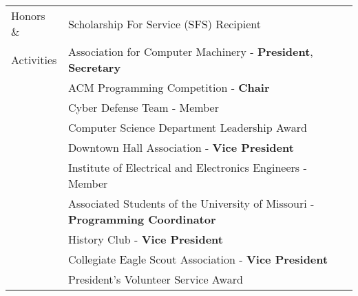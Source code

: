 \documentclass[10.5pt, arial]{article}
\begin{document}
\begin{tabular}{p{1.5cm} l}
Honors \&	& Scholarship For Service (SFS) Recipient 							\\
Activities	& Association for Computer Machinery - \textbf{President}, \textbf{Secretary}			\\
			& ACM Programming Competition - \textbf{Chair}						\\
			& Cyber Defense Team - Member										\\
			& Computer Science Department Leadership Award 						\\
			& Downtown Hall Association - \textbf{Vice President}				\\
			& Institute of Electrical and Electronics Engineers - Member		\\
			& Associated Students of the University of Missouri - \textbf{Programming Coordinator} 		\\
			& History Club - \textbf{Vice President} 							\\
			& Collegiate Eagle Scout Association - \textbf{Vice President} 		\\
			& President's Volunteer Service Award								\\
\end{tabular}
\end{document}

